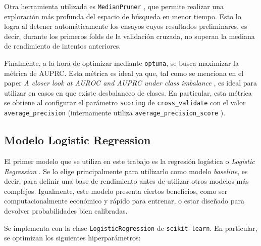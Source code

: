 Otra herramienta utilizada es \texttt{MedianPruner} \citep{WEBSITE:MedianPruner}, que permite realizar una exploración más profunda del espacio de búsqueda en menor tiempo. Esto lo logra al detener automáticamente los ensayos cuyos resultados preliminares, es decir, durante los primeros folds de la validación cruzada, no superan la mediana de rendimiento de intentos anteriores.

Finalmente, a la hora de optimizar mediante \texttt{optuna}, se busca maximizar la métrica de AUPRC. Esta métrica es ideal ya que, tal como se menciona en el paper \textit{A closer look at AUROC and AUPRC under class imbalance} \citep{article:closer_look_auprc}, es ideal para utilizar en casos en que existe desbalanceo de clases. En particular, esta métrica se obtiene al configurar el parámetro \texttt{scoring} de \texttt{cross\_validate} con el valor \texttt{average\_precision} \citep{WEBSITE:scikit_learn_scoring_names} (internamente utiliza \texttt{average\_precision\_score} \citep{WEBSITE:average_precision_score}).

\subsection{Modelo Logistic Regression}
\label{subsec:cap3_models_lr}

El primer modelo que se utiliza en este trabajo es la regresión logística o \textit{Logistic Regression} \citep{model:lr}. Se lo elige principalmente para utilizarlo como modelo \textit{baseline}, es decir, para definir una base de rendimiento antes de utilizar otros modelos más complejos. Igualmente, este modelo presenta ciertos beneficios, como ser computacionalmente económico y rápido para entrenar, o estar diseñado para devolver probabilidades bien calibradas.

Se implementa con la clase \texttt{LogisticRegression} \citep{WEBSITE:sklearn_LogisticRegression} de \texttt{scikit-learn}. En particular, se optimizan los siguientes hiperparámetros:

